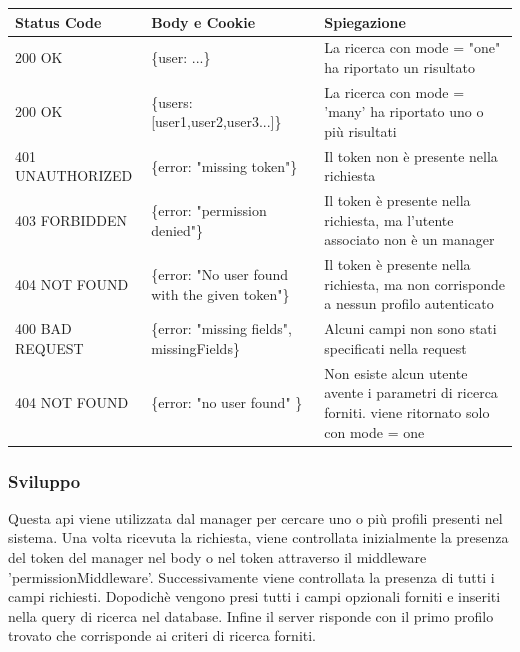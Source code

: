 \documentclass{report}
\begin{document}
		\begin{center} %
			\centering
			\begin{tabular}{ |p{4cm}|p{5cm}|p{4cm}| }
				\hline
				\centering Status Code & \qquad\quad Body e Cookie                                & \qquad\qquad Spiegazione                              \\ %
				\hline
				200 OK                 & \{user: {...}\} 			  & La ricerca con mode = "one" ha riportato un risultato                           \\
				\hline
				200 OK 				   & \{users: [user1,user2,user3...]\} & La ricerca con mode = 'many' ha riportato uno o più risultati              \\
				\hline
				401 UNAUTHORIZED       & \{error: "missing token"\} 							  & Il token non è presente nella richiesta				  \\
				\hline
				403 FORBIDDEN		   & \{error: "permission denied"\}							  & Il token è presente nella richiesta, ma l'utente associato non è un manager \\	
				\hline
				404 NOT FOUND 		   & \{error: "No user found with the given token"\}          & Il token è presente nella richiesta, ma non corrisponde a nessun profilo autenticato \\
				\hline
				400 BAD REQUEST        & \{error: "missing fields", missingFields\}               & Alcuni campi non sono stati specificati nella request \\ %
				\hline
				404 NOT FOUND 		   & \{error: "no user found" \}				  & Non esiste alcun utente avente i parametri di ricerca forniti. viene ritornato solo con mode = one   \\
				\hline
			\end{tabular}
		\end{center}
		\subsubsection*{Sviluppo}
		Questa api viene utilizzata dal manager per cercare uno o più  profili presenti nel sistema.
		Una volta ricevuta la richiesta, viene controllata inizialmente la presenza del token del manager nel body o nel token attraverso il middleware 'permissionMiddleware'.
		Successivamente viene controllata la presenza di tutti i campi richiesti.
		Dopodichè vengono presi tutti i campi opzionali forniti e inseriti nella query di ricerca nel database.
		Infine il server risponde con il primo profilo trovato che corrisponde ai criteri di ricerca forniti.
	
\end{document}

